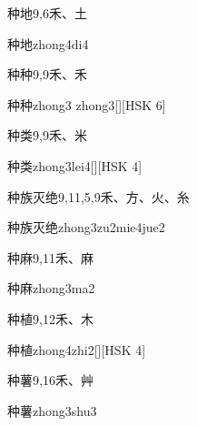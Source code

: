\begin{Entry}{种地}{9,6}{⽲、⼟}
  \begin{Phonetics}{种地}{zhong4di4}
  \end{Phonetics}
\end{Entry}

\begin{Entry}{种种}{9,9}{⽲、⽲}
  \begin{Phonetics}{种种}{zhong3 zhong3}[][HSK 6]
  \end{Phonetics}
\end{Entry}

\begin{Entry}{种类}{9,9}{⽲、⽶}
  \begin{Phonetics}{种类}{zhong3lei4}[][HSK 4]
  \end{Phonetics}
\end{Entry}

\begin{Entry}{种族灭绝}{9,11,5,9}{⽲、⽅、⽕、⽷}
  \begin{Phonetics}{种族灭绝}{zhong3zu2mie4jue2}
  \end{Phonetics}
\end{Entry}

\begin{Entry}{种麻}{9,11}{⽲、⿇}
  \begin{Phonetics}{种麻}{zhong3ma2}
  \end{Phonetics}
\end{Entry}

\begin{Entry}{种植}{9,12}{⽲、⽊}
  \begin{Phonetics}{种植}{zhong4zhi2}[][HSK 4]
  \end{Phonetics}
\end{Entry}

\begin{Entry}{种薯}{9,16}{⽲、⾋}
  \begin{Phonetics}{种薯}{zhong3shu3}
  \end{Phonetics}
\end{Entry}

